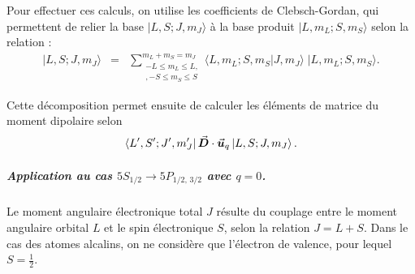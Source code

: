\medskip

Pour effectuer ces calculs, on utilise les coefficients de Clebsch-Gordan, qui permettent de relier la base $|L,S;J,m_J\rangle$ à la base produit $|L,m_L;S,m_S\rangle$ selon la relation :
\begin{eqnarray}
	|L, S; J, m_J\rangle  &=& \sum_{\substack{-L \leq m_L \leq L,\\, -S \leq m_S \leq S  }}^{m_L + m_S = m_J} \langle L, m_L; S, m_S | J, m_J \rangle \; |L, m_L; S, m_S\rangle.
\end{eqnarray}




Cette décomposition permet ensuite de calculer les éléments de matrice du moment dipolaire selon
\begin{eqnarray}
	\bra{L', S'; J', m_J'} \vec{{\bm{D}}} \cdot \vec{{\bm{u}}}_q \ket{L, S; J, m_J}.
\end{eqnarray}




\subparagraph{Application au cas $5S_{1/2} \rightarrow 5P_{1/2,\,3/2}$ avec $q = 0$.}


Le moment angulaire électronique total $J$ résulte du couplage entre le moment angulaire orbital $L$ et le spin électronique $S$, selon la relation $J = L + S$. Dans le cas des atomes alcalins, on ne considère que l’électron de valence, pour lequel $S = \tfrac12$.\\

